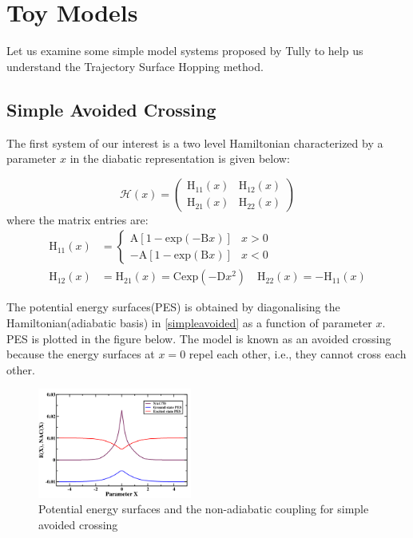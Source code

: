 \section{Toy Models}

Let us examine some simple model systems proposed by Tully to help us understand the Trajectory Surface Hopping method.\cite{tully_1} 

\subsection{Simple Avoided Crossing}

The first system of our interest is a two level Hamiltonian characterized by a parameter $x$ in the diabatic representation is given below:

    \begin{equation} \label{simpleavoided}
        \mathcal{H}(x) = 
        \begin{pmatrix}
            \text{H}_{11}(x) & \text{H}_{12}(x) \\
            \text{H}_{21}(x) & \text{H}_{22}(x)
        \end{pmatrix}
    \end{equation}
where the matrix entries are:
    \begin{align*}
        \text{H}_{11}(x) &=  \begin{cases} \text{A}\left[1-\text{exp}(-\text{B}x)\right] & x > 0  \\ -\text{A}[1-\text{exp}(\text{B}x)] & x < 0 \end{cases} \\
        \text{H}_{12}(x) &= \text{H}_{21}(x) = \text{C}\text{exp}(-\text{D}x^2) \quad
        \text{H}_{22}(x) = -\text{H}_{11}(x)
    \end{align*}

The potential energy surfaces(PES) is obtained by diagonalising the Hamiltonian(adiabatic basis) in \eqref{simpleavoided} as a function of parameter $x$. PES is plotted in the figure below. The model is known as an avoided crossing because the energy surfaces at $x=0$ repel each other, i.e., they cannot cross each other. 
    
    \begin{figure}[H]
        \begin{center}
        \includegraphics[width = 0.45\textwidth]{images/NAC.png}
        \end{center}
        \caption{Potential energy surfaces and the non-adiabatic coupling for simple avoided crossing}
        \label{fig:PES_Simpleavoided}
    \end{figure}

